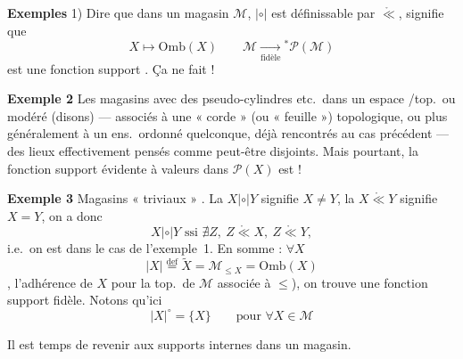 \documentclass[11pt,a4paper]{article}
\begin{document}
\textbf{Exemples} 1)  Dire que dans \struck{\ill{}} un magasin $\mathcal{M}$, \struck{\ill{}} $|\circ|$ est définissable par $\mathrel{\mathring{\ll}}$, signifie que
\[
  X \longmapsto \mathrm{Omb}(X) \qquad \mathcal{M} \xrightarrow[\text{fidèle}]{\ \ } {}^{*}\mathcal{P}(\mathcal{M})
\]
est une fonction support .  Ça ne fait      !

\textbf{Exemple 2} Les magasins  avec des pseudo-cylindres etc.\ dans un espace /top.\ ou modéré (disons) --- \struck{\ill{}} associés à une « corde » (ou « feuille ») topologique, ou plus généralement à un ens.\ ordonné quelconque, déjà rencontrés au cas précédent --- des lieux effectivement pensés comme peut-être disjoints. Mais pourtant, la fonction support évidente à valeurs dans $\mathcal{P}(X)$ est  !

\textbf{Exemple 3} Magasins « triviaux »  . La   $X \mathrel{|\circ|} Y$ signifie $X \neq Y$, la   $X \mathrel{\mathring{\ll}} Y$ signifie $X = Y$, on a donc \struck{\ill{}}
\[
  X \mathrel{|\circ|} Y \text{ ssi } \nexists Z,\ Z \mathrel{\mathring{\ll}} X,\ Z \mathrel{\mathring{\ll}} Y,
\]
i.e.\ on est dans le cas de l'exemple~1. En somme : $\forall X$
\[
  |X| \overset{\mathrm{def}}{=} \widetilde{X} = \mathcal{M}_{\leq X} = \mathrm{Omb}(X)
\]
 , l'adhérence de $X$ pour la top.\ de $\mathcal{M}$ associée à $\leq$), on trouve une fonction support fidèle. Notons qu'ici
\[
  |X|^{\circ} = \{ X \} \qquad \text{pour } \forall X \in \mathcal{M}
\]

Il est temps de revenir aux supports internes dans un magasin.
\end{document}
